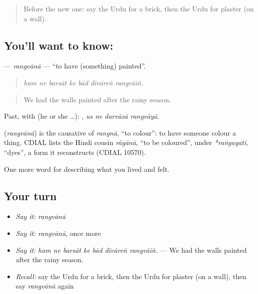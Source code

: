 \begin{quote}
Before the new one: say the Urdu for a brick, then the Urdu for plaster (on a wall).
\end{quote}

\subsection*{You'll want to know: }
\textbf{} — \emph{rangvānā} — \textquotedblleft{}to have (something) painted\textquotedblright{}.

\begin{quote}
      
\end{quote}

\begin{quote}
\emph{ham ne barsāt ke bād dīvāreṅ rangvāīṅ.}
\end{quote}

\begin{quote}
We had the walls painted after the rainy season.
\end{quote}

Past, with  (he or she …):    , \emph{us ne darvāzā rangvāyā}.

\begin{cousinweb}
\textbf{} (\emph{rangvānā}) is the causative of \emph{rangnā}, \textquotedblleft{}to colour\textquotedblright{}: to have someone colour a thing. CDIAL lists the Hindi cousin \emph{rãgānā}, \textquotedblleft{}to be coloured\textquotedblright{}, under \emph{*raṅgayati}, \textquotedblleft{}dyes\textquotedblright{}, a form it reconstructs (CDIAL 10570).
\end{cousinweb}

\begin{grammarlens}[title={What you've built}]
One more word for describing what you lived and felt.
\end{grammarlens}

\subsection*{Your turn}
\begin{itemize}
\raggedright
  \item \emph{Say it:} \emph{rangvānā}
  \item \emph{Say it:} \emph{rangvānā}, once more
  \item \emph{Say it:} \emph{ham ne barsāt ke bād dīvāreṅ rangvāīṅ.} — We had the walls painted after the rainy season.
  \item \emph{Recall:} say the Urdu for a brick, then the Urdu for plaster (on a wall), then say \emph{rangvānā} again
\end{itemize}


